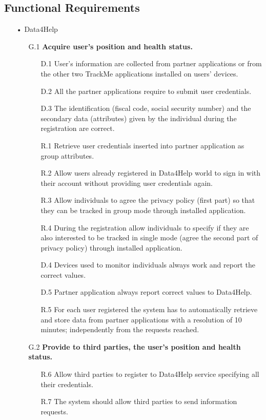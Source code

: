 \subsection{Functional Requirements}
\begin{enumerate}
\item[•]{\Large Data4Help}
	\begin{enumerate}
	\item [G.1] \textbf{Acquire user's position and health status.}
		\begin{enumerate}
		\item [D.1] User's information are collected from partner applications or from the other two TrackMe applications installed on users' devices.
		\item [D.2] All the partner applications require to submit user credentials.
		\item [D.3] The identification (fiscal code, social security number) and the secondary data (attributes) given by the individual during the registration are correct.
		\item [R.1] Retrieve user credentials inserted into partner application as group attributes.
		\item [R.2] Allow users already registered in Data4Help world to sign in with their account without providing user credentials again.
		\item [R.3] Allow individuals to agree the privacy policy (first part) so that they can be tracked in group mode through installed application.  
		\item [R.4] During the registration allow individuals to specify if they are also interested to be tracked in single mode (agree the second part of privacy policy) through installed application. 
		\item [D.4] Devices used to monitor individuals always work and report the correct values.	
    	\item [D.5] Partner application always report correct values to Data4Help.
    	\item [R.5] For each user registered the system has to automatically retrieve and store data from partner applications with a resolution of 10 minutes; independently from the requests reached.
    	\end{enumerate}	
    	
    \item [G.2] \textbf{Provide to third parties, the user's position and health status.}
    	\begin{enumerate} 
    	\item [R.6] Allow third parties to register to Data4Help service specifying all their credentials.
		\item [R.7] The system should allow third parties to send information requests.
    	\end{enumerate}	
		

\end{enumerate}
\end{enumerate}
